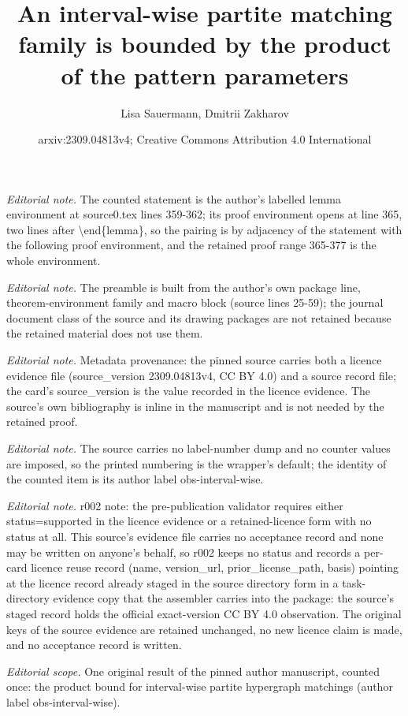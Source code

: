 \documentclass[10pt,a4paper]{article}
\title{An interval-wise partite matching family is bounded by the product of the pattern parameters}
\author{Lisa Sauermann, Dmitrii Zakharov}
\date{arxiv:2309.04813v4; Creative Commons Attribution 4.0 International}
\theoremstyle{definition}
\begin{document}
\maketitle
\noindent\textit{Editorial note.} The counted statement is the author's labelled lemma environment at source0.tex lines 359-362; its proof environment opens at line 365, two lines after \textbackslash{}end\{lemma\}, so the pairing is by adjacency of the statement with the following proof environment, and the retained proof range 365-377 is the whole environment.\par\medskip
\noindent\textit{Editorial note.} The preamble is built from the author's own package line, theorem-environment family and macro block (source lines 25-59); the journal document class of the source and its drawing packages are not retained because the retained material does not use them.\par\medskip
\noindent\textit{Editorial note.} Metadata provenance: the pinned source carries both a licence evidence file (source\_version 2309.04813v4, CC BY 4.0) and a source record file; the card's source\_version is the value recorded in the licence evidence. The source's own bibliography is inline in the manuscript and is not needed by the retained proof.\par\medskip
\noindent\textit{Editorial note.} The source carries no label-number dump and no counter values are imposed, so the printed numbering is the wrapper's default; the identity of the counted item is its author label obs-interval-wise.\par\medskip
\noindent\textit{Editorial note.} r002 note: the pre-publication validator requires either status=supported in the licence evidence or a retained-licence form with no status at all. This source's evidence file carries no acceptance record and none may be written on anyone's behalf, so r002 keeps no status and records a per-card licence reuse record (name, version\_url, prior\_license\_path, basis) pointing at the licence record already staged in the source directory form in a task-directory evidence copy that the assembler carries into the package: the source's staged record holds the official exact-version CC BY 4.0 observation. The original keys of the source evidence are retained unchanged, no new licence claim is made, and no acceptance record is written.\par\medskip
\noindent\textit{Editorial scope.} One original result of the pinned author manuscript, counted once: the product bound for interval-wise partite hypergraph matchings (author label obs-interval-wise).\par\medskip
\end{document}
